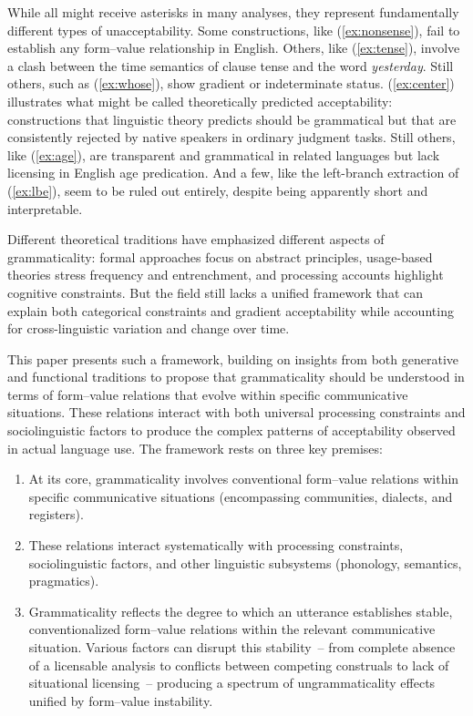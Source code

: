 \documentclass[12pt,letterpaper]{article}
\newcommand{\mention}[1]{\textit{#1}}
\begin{document}
While all might receive asterisks in many analyses, they represent fundamentally different types of unacceptability. Some constructions, like (\ref{ex:nonsense}), fail to establish any form--value relationship in English. Others, like (\ref{ex:tense}), involve a clash between the time semantics of clause tense and the word \mention{yesterday}. Still others, such as (\ref{ex:whose}), show gradient or indeterminate status. (\ref{ex:center}) illustrates what might be called theoretically predicted acceptability: constructions that linguistic theory predicts should be grammatical but that are consistently rejected by native speakers in ordinary judgment tasks. Still others, like (\ref{ex:age}), are transparent and grammatical in related languages but lack licensing in English age predication. And a few, like the left-branch extraction of (\ref{ex:lbe}), seem to be ruled out entirely, despite being apparently short and interpretable.

Different theoretical traditions have emphasized different aspects of grammaticality: formal approaches focus on abstract principles, usage-based theories stress frequency and entrenchment, and processing accounts highlight cognitive constraints. But the field still lacks a unified framework that can explain both categorical constraints and gradient acceptability while accounting for cross-linguistic variation and change over time.

This paper presents such a framework, building on insights from both generative and functional traditions to propose that grammaticality should be understood in terms of form--value relations that evolve within specific communicative situations. These relations interact with both universal processing constraints and sociolinguistic factors to produce the complex patterns of acceptability observed in actual language use. The framework rests on three key premises:

\begin{enumerate}
\item At its core, grammaticality involves conventional form--value relations within specific communicative situations (encompassing communities, dialects, and registers).
\item These relations interact systematically with processing constraints, sociolinguistic factors, and other linguistic subsystems (phonology, semantics, pragmatics).
\item Grammaticality reflects the degree to which an utterance establishes stable, conventionalized form--value relations within the relevant communicative situation. Various factors can disrupt this stability~-- from complete absence of a licensable analysis to conflicts between competing construals to lack of situational licensing~-- producing a spectrum of ungrammaticality effects unified by form--value instability.
\end{enumerate}
\end{document}
